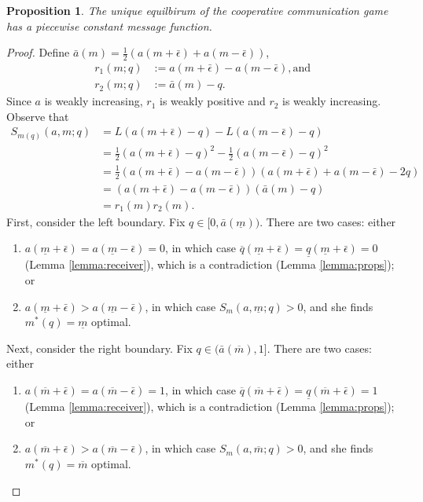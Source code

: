 \documentclass[12pt]{article}
\newtheorem{proposition}{Proposition}
\begin{document}
\begin{proposition}
The unique equilbirum of the cooperative communication game has a piecewise constant message function. 
\end{proposition}
\begin{proof}
Define $\bar{a}(m)=\tfrac{1}{2}(a(m+\bar{\epsilon})+a(m-\bar{\epsilon}))$,
\begin{align}
r_{1}(m;q)&:=a(m+\bar{\epsilon})-a(m-\bar{\epsilon}),\text{and }\\
r_{2}(m;q)&:=\bar{a}(m)-q.
\end{align}
Since $a$ is weakly increasing, $r_{1}$ is weakly positive and $r_{2}$ is weakly increasing. Observe that
\begin{align}
S_{m(q)}(a,m;q)&=L(a(m+\bar{\epsilon})-q)-L(a(m-\bar{\epsilon})-q)\\
&=\tfrac{1}{2}(a(m+\bar{\epsilon})-q)^{2}-\tfrac{1}{2}(a(m-\bar{\epsilon})-q)^{2}\\
&=\tfrac{1}{2}(a(m+\bar{\epsilon})-a(m-\bar{\epsilon}))(a(m+\bar{\epsilon})+a(m-\bar{\epsilon})-2q)\\
&=(a(m+\bar{\epsilon})-a(m-\bar{\epsilon}))(\bar{a}(m)-q)\\
&=r_{1}(m)r_{2}(m).
\end{align}
First, consider the left boundary. Fix $q\in[0,\bar{a}(\underline{m}))$. There are two cases: either
\begin{enumerate}
\item $a(\underline{m}+\bar{\epsilon})=a(\underline{m}-\bar{\epsilon})=0$, in which case $\overline{q}(\underline{m}+\bar{\epsilon})=\underline{q}(\underline{m}+\bar{\epsilon})=0$ (Lemma \ref{lemma:receiver}), which is a contradiction (Lemma \ref{lemma:props}); or
\item $a(\underline{m}+\bar{\epsilon})>a(\underline{m}-\bar{\epsilon})$, in which case $S_{m}(a,\underline{m};q)>0$, and she finds $m^{*}(q)=\underline{m}$ optimal.
\end{enumerate} 
Next, consider the right boundary. Fix $q\in(\bar{a}(\overline{m}),1]$. There are two cases: either
\begin{enumerate}
\item $a(\overline{m}+\bar{\epsilon})=a(\overline{m}-\bar{\epsilon})=1$, in which case $\overline{q}(\overline{m}+\bar{\epsilon})=\underline{q}(\overline{m}+\bar{\epsilon})=1$ (Lemma \ref{lemma:receiver}), which is a contradiction (Lemma \ref{lemma:props}); or
\item $a(\overline{m}+\bar{\epsilon})>a(\overline{m}-\bar{\epsilon})$, in which case $S_{m}(a,\overline{m};q)>0$, and she finds $m^{*}(q)=\overline{m}$ optimal.

\end{enumerate}
\end{proof}
\end{document}
